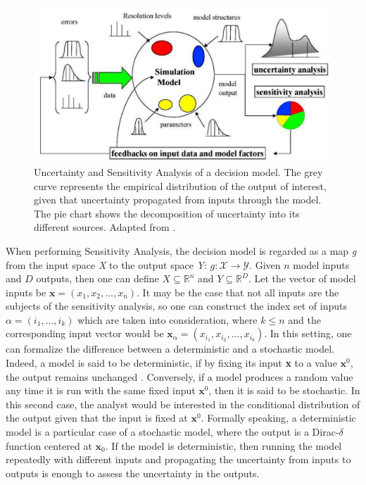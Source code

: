 \begin{figure}[H]
    \centering
    \includegraphics[scale = 0.7]{tex/pics/sensitivity_saltelli.png}
    \caption{Uncertainty and Sensitivity Analysis of a decision model. The grey curve represents the empirical distribution of the output of interest, given that uncertainty propagated from inputs through the model. The pie chart shows the decomposition of uncertainty into its different sources. Adapted from \textcite{saltelli}.}
    \label{fig:sensitivity_saltelli}
\end{figure}

When performing Sensitivity Analysis, the decision model is regarded as a map \textit{g} from the input space \textit{X} to the output space \textit{Y}: $g: \mathcal{X} \rightarrow \mathcal{Y}$. Given $n$ model inputs and $D$ outputs, then one can define $X \subseteq \mathbb{R}^n$ and $Y \subseteq \mathbb{R}^D$. Let the vector of model inputs be $\mathbf{x} = (x_1, x_2, ..., x_n)$. It may be the case that not all inputs are the subjects of the sensitivity analysis, so one can construct the index set of inputs $\alpha = (i_1, ..., i_k)$ which are taken into consideration, where $k\leq n$ and the corresponding input vector would be $\textbf{x}_{\alpha} = (x_{i_1}, x_{i_2}, ..., x_{i_k})$. In this setting, one can formalize the difference between a deterministic and a stochastic model. Indeed, a model is said to be deterministic, if by fixing its input \textbf{x} to a value $\textbf{x}^0$, the output remains unchanged \cite{Borgonovo2017SensitivityAA}. Conversely, if a model produces a random value any time it is run with the same fixed input $\textbf{x}^0$, then it is said to be stochastic. In this second case, the analyst would be interested in the conditional distribution of the output given that the input is fixed at $\textbf{x}^0$. Formally speaking, a deterministic model is a particular case of a stochastic model, where the output is a Dirac-$\delta$ function centered at $\textbf{x}_0$. If the model is deterministic, then running the model repeatedly with different inputs and propagating the uncertainty from inputs to outputs is enough to assess the uncertainty in the outputs. 

